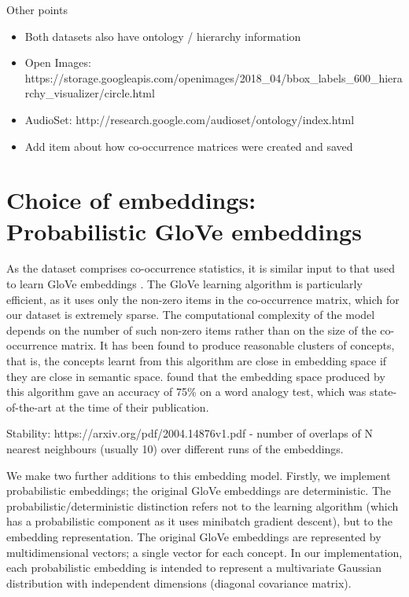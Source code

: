 Other points

\begin{itemize}
    \item Both datasets also have ontology / hierarchy information
    \item Open Images: https://storage.googleapis.com/openimages/2018\_04/bbox\_labels\_600\_hierarchy\_visualizer/circle.html
    \item AudioSet: http://research.google.com/audioset/ontology/index.html
    \item Add item about how co-occurrence matrices were created and saved
\end{itemize}

\section{Choice of embeddings: Probabilistic GloVe embeddings}

As the dataset comprises co-occurrence statistics, it is similar input to that used to learn GloVe embeddings \cite{pennington2014glove}. The GloVe learning algorithm is particularly efficient, as it uses only the non-zero items in the co-occurrence matrix, which for our dataset is extremely sparse. The computational complexity of the model depends on the number of such non-zero items rather than on the size of the co-occurrence matrix. It has been found to produce reasonable clusters of concepts, that is, the concepts learnt from this algorithm are close in embedding space if they are close in semantic space. \cite{pennington2014glove} found that the embedding space produced by this algorithm gave an accuracy of 75\% on a word analogy test, which was state-of-the-art at the time of their publication. 

Stability: https://arxiv.org/pdf/2004.14876v1.pdf - number of overlaps of N nearest neighbours (usually 10) over different runs of the embeddings. 

We make two further additions to this embedding model. Firstly, we implement probabilistic embeddings; the original GloVe embeddings are deterministic. The probabilistic/deterministic distinction refers not to the learning algorithm (which has a probabilistic component as it uses minibatch gradient descent), but to the embedding representation. The original GloVe embeddings are represented by multidimensional vectors; a single vector for each concept. In our implementation, each probabilistic embedding is intended to represent a multivariate Gaussian distribution with independent dimensions (diagonal covariance matrix). 

